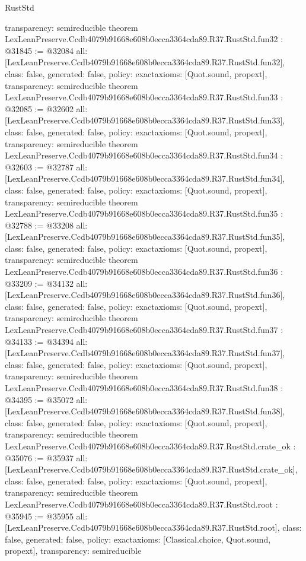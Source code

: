 \begin{lexlean}{RustStd}
\begin{coremodule}
{  transparency: semireducible
}
theorem LexLeanPreserve.Ccdb4079b91668e608b0ecca3364cda89.R37.RustStd.fun32 : @31845 := @32084 {
  all: [LexLeanPreserve.Ccdb4079b91668e608b0ecca3364cda89.R37.RustStd.fun32],
  class: false,
  generated: false,
  policy: exact{axioms: [Quot.sound, propext]},
  transparency: semireducible
}
theorem LexLeanPreserve.Ccdb4079b91668e608b0ecca3364cda89.R37.RustStd.fun33 : @32085 := @32602 {
  all: [LexLeanPreserve.Ccdb4079b91668e608b0ecca3364cda89.R37.RustStd.fun33],
  class: false,
  generated: false,
  policy: exact{axioms: [Quot.sound, propext]},
  transparency: semireducible
}
theorem LexLeanPreserve.Ccdb4079b91668e608b0ecca3364cda89.R37.RustStd.fun34 : @32603 := @32787 {
  all: [LexLeanPreserve.Ccdb4079b91668e608b0ecca3364cda89.R37.RustStd.fun34],
  class: false,
  generated: false,
  policy: exact{axioms: [Quot.sound, propext]},
  transparency: semireducible
}
theorem LexLeanPreserve.Ccdb4079b91668e608b0ecca3364cda89.R37.RustStd.fun35 : @32788 := @33208 {
  all: [LexLeanPreserve.Ccdb4079b91668e608b0ecca3364cda89.R37.RustStd.fun35],
  class: false,
  generated: false,
  policy: exact{axioms: [Quot.sound, propext]},
  transparency: semireducible
}
theorem LexLeanPreserve.Ccdb4079b91668e608b0ecca3364cda89.R37.RustStd.fun36 : @33209 := @34132 {
  all: [LexLeanPreserve.Ccdb4079b91668e608b0ecca3364cda89.R37.RustStd.fun36],
  class: false,
  generated: false,
  policy: exact{axioms: [Quot.sound, propext]},
  transparency: semireducible
}
theorem LexLeanPreserve.Ccdb4079b91668e608b0ecca3364cda89.R37.RustStd.fun37 : @34133 := @34394 {
  all: [LexLeanPreserve.Ccdb4079b91668e608b0ecca3364cda89.R37.RustStd.fun37],
  class: false,
  generated: false,
  policy: exact{axioms: [Quot.sound, propext]},
  transparency: semireducible
}
theorem LexLeanPreserve.Ccdb4079b91668e608b0ecca3364cda89.R37.RustStd.fun38 : @34395 := @35072 {
  all: [LexLeanPreserve.Ccdb4079b91668e608b0ecca3364cda89.R37.RustStd.fun38],
  class: false,
  generated: false,
  policy: exact{axioms: [Quot.sound, propext]},
  transparency: semireducible
}
theorem LexLeanPreserve.Ccdb4079b91668e608b0ecca3364cda89.R37.RustStd.crate_ok : @35076 := @35937 {
  all: [LexLeanPreserve.Ccdb4079b91668e608b0ecca3364cda89.R37.RustStd.crate_ok],
  class: false,
  generated: false,
  policy: exact{axioms: [Quot.sound, propext]},
  transparency: semireducible
}
theorem LexLeanPreserve.Ccdb4079b91668e608b0ecca3364cda89.R37.RustStd.root : @35945 := @35955 {
  all: [LexLeanPreserve.Ccdb4079b91668e608b0ecca3364cda89.R37.RustStd.root],
  class: false,
  generated: false,
  policy: exact{axioms: [Classical.choice, Quot.sound, propext]},
  transparency: semireducible
}


\end{coremodule}
\end{lexlean}
